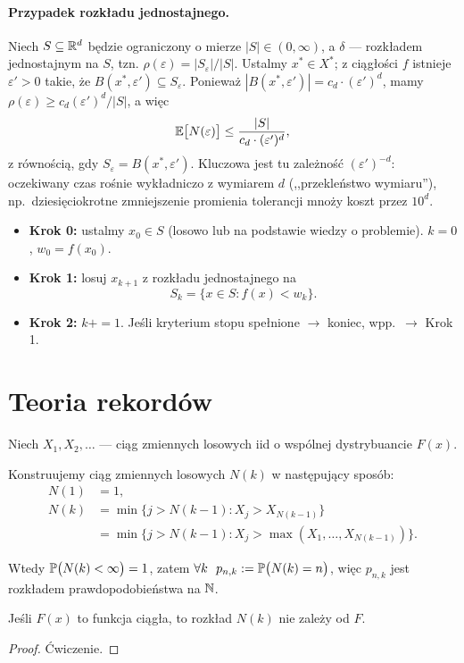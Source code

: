 \documentclass[dvipsnames]{book}
\begin{document}
\paragraph{Przypadek rozkładu jednostajnego.}
Niech $S \subseteq \R^d$ będzie ograniczony o mierze $|S| \in (0,\infty)$, a
$\delta$ --- rozkładem jednostajnym na $S$, tzn.
$\rho(\varepsilon) = |S_\varepsilon| / |S|$. Ustalmy $x^* \in X^*$; z ciągłości
$f$ istnieje $\varepsilon' > 0$ takie, że $B(x^*, \varepsilon') \subseteq S_\varepsilon$.
Ponieważ $|B(x^*, \varepsilon')| = c_d \cdot (\varepsilon')^d$, mamy
$\rho(\varepsilon) \geq c_d (\varepsilon')^d / |S|$, a więc
\[
  \E\big[N(\varepsilon)\big] \leq \frac{|S|}{c_d \cdot (\varepsilon')^d},
\]
z równością, gdy $S_\varepsilon = B(x^*, \varepsilon')$. Kluczowa jest tu
zależność $(\varepsilon')^{-d}$: oczekiwany czas rośnie wykładniczo z wymiarem
$d$ (,,przekleństwo wymiaru''), np.\ dziesięciokrotne zmniejszenie promienia
tolerancji mnoży koszt przez $10^d$.

\hrulefill

\begin{algorytm}
\begin{itemize}[topsep=0pt,itemsep=0pt]
  \item \textbf{Krok 0:} ustalmy $x_0 \in S$ (losowo lub na podstawie wiedzy o
  problemie). $k = 0$, $w_0 = f(x_0)$.
  \item \textbf{Krok 1:} losuj $x_{k+1}$ z rozkładu jednostajnego na
  \[
    S_k = \{x \in S : f(x) < w_k\}.
  \]
  \item \textbf{Krok 2:} $k \mathrel{{+}{=}} 1$. Jeśli kryterium stopu spełnione
  $\longrightarrow$ koniec, wpp.\ $\longrightarrow$ Krok 1.
\end{itemize}
\end{algorytm}

\hrulefill

\section*{Teoria rekordów}

Niech $X_1, X_2, \ldots$ --- ciąg zmiennych losowych iid o wspólnej dystrybuancie
$F(x)$.

Konstruujemy ciąg zmiennych losowych $N(k)$ w następujący sposób:
\begin{align*}
  N(1) &= 1, \\
  N(k) &= \min\big\{j > N(k-1) : X_j > X_{N(k-1)}\big\} \\
       &= \min\big\{j > N(k-1) : X_j > \max(X_1, \ldots, X_{N(k-1)})\big\}.
\end{align*}

Wtedy $\P\big(N(k) < \infty\big) = 1$, zatem
$\forall k\ \ p_{n,k} := \P\big(N(k) = n\big)$, więc $p_{n,k}$ jest rozkładem
prawdopodobieństwa na $\N$.

\begin{lemat}
Jeśli $F(x)$ to funkcja ciągła, to rozkład $N(k)$ nie zależy od $F$.
\end{lemat}

\begin{proof}
Ćwiczenie.
\end{proof}
\end{document}
